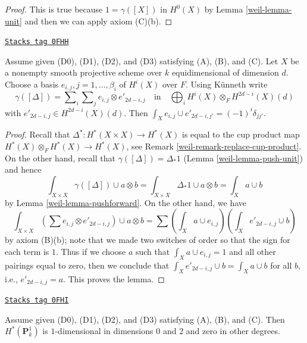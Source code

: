 \begin{proof}

This is true because $1 = \gamma([X])$ in $H^0(X)$ by Lemma \ref{weil-lemma-unit}
and then we can apply axiom (C)(b).
\end{proof}

\begin{lemma}
\label{weil-lemma-class-diagonal}
\href{https://stacks.math.columbia.edu/tag/0FHH}{\texttt{Stacks tag 0FHH}}

Assume given (D0), (D1), (D2), and (D3) satisfying (A), (B), and (C).
Let $X$ be a nonempty smooth projective scheme over $k$ equidimensional
of dimension $d$. Choose a basis $e_{i, j}, j = 1, \ldots, \beta_i$ of
$H^i(X)$ over $F$. Using K\"unneth write
$$
\gamma([\Delta]) =
\sum\nolimits_i
\sum\nolimits_j e_{i, j} \otimes e'_{2d - i , j}
\quad\text{in}\quad
\bigoplus\nolimits_i H^i(X) \otimes_F H^{2d - i}(X)(d)
$$
with $e'_{2d - i, j} \in H^{2d - i}(X)(d)$.
Then $\int_X e_{i, j} \cup e'_{2d - i, j'} = (-1)^i\delta_{jj'}$.
\end{lemma}

\begin{proof}

Recall that $\Delta^* : H^*(X \times X) \to H^*(X)$ is equal to the
cup product map $H^*(X) \otimes_F H^*(X) \to H^*(X)$, see
Remark \ref{weil-remark-replace-cup-product}. On the other
hand, recall that $\gamma([\Delta]) = \Delta_*1$ (Lemma \ref{weil-lemma-push-unit})
and hence
$$
\int_{X \times X} \gamma([\Delta]) \cup a \otimes b =
\int_{X \times X} \Delta_*1 \cup a \otimes b =
\int_X a \cup b
$$
by Lemma \ref{weil-lemma-pushforward}.
On the other hand, we have
$$
\int_{X \times X} (\sum e_{i, j} \otimes e'_{2d -i , j}) \cup a \otimes b =
\sum (\int_X a \cup e_{i, j})(\int_X e'_{2d - i, j} \cup b)
$$
by axiom (B)(b); note that we made two switches of order so that the sign
for each term is $1$. Thus if we choose $a$ such that
$\int_X a \cup e_{i, j} = 1$ and all other pairings equal to zero, then
we conclude that $\int_X e'_{2d - i, j} \cup b = \int_X a \cup b$
for all $b$, i.e., $e'_{2d - i, j} = a$. This proves the lemma.
\end{proof}

\begin{lemma}[Cohomology P1]
\label{weil-lemma-cohomology-P1}
\href{https://stacks.math.columbia.edu/tag/0FHI}{\texttt{Stacks tag 0FHI}}

Assume given (D0), (D1), (D2), and (D3) satisfying (A), (B), and (C).
Then $H^*(\mathbf{P}^1_k)$ is $1$-dimensional in dimensions $0$ and $2$
and zero in other degrees.
\end{lemma}

